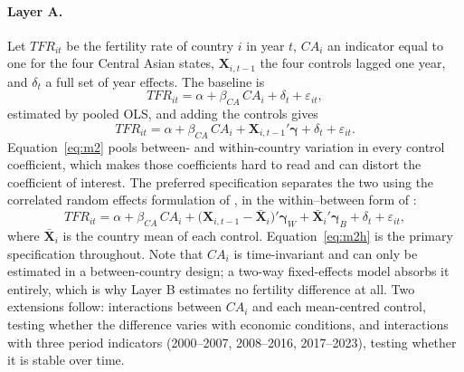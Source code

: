 \paragraph{Layer A.} Let $TFR_{it}$ be the fertility rate of country $i$ in year $t$, $CA_i$ an indicator equal to one for the four Central Asian states, $\mathbf{X}_{i,t-1}$ the four controls lagged one year, and $\delta_t$ a full set of year effects. The baseline is
\begin{equation}
TFR_{it} = \alpha + \beta_{CA}\, CA_i + \delta_t + \varepsilon_{it},
\label{eq:m1}
\end{equation}
estimated by pooled OLS, and adding the controls gives
\begin{equation}
TFR_{it} = \alpha + \beta_{CA}\, CA_i + \mathbf{X}_{i,t-1}'\boldsymbol{\gamma} + \delta_t + \varepsilon_{it}.
\label{eq:m2}
\end{equation}
Equation~\eqref{eq:m2} pools between- and within-country variation in every control coefficient, which makes those coefficients hard to read and can distort the coefficient of interest. The preferred specification separates the two using the correlated random effects formulation of \textcite{mundlak1978}, in the within--between form of \textcite{bell2015}:
\begin{equation}
TFR_{it} = \alpha + \beta_{CA}\, CA_i
+ \big(\mathbf{X}_{i,t-1}-\bar{\mathbf{X}}_i\big)'\boldsymbol{\gamma}_W
+ \bar{\mathbf{X}}_i'\boldsymbol{\gamma}_B
+ \delta_t + \varepsilon_{it},
\label{eq:m2h}
\end{equation}
where $\bar{\mathbf{X}}_i$ is the country mean of each control. Equation~\eqref{eq:m2h} is the primary specification throughout. Note that $CA_i$ is time-invariant and can only be estimated in a between-country design; a two-way fixed-effects model absorbs it entirely, which is why Layer B estimates no fertility difference at all. Two extensions follow: interactions between $CA_i$ and each mean-centred control, testing whether the difference varies with economic conditions, and interactions with three period indicators (2000--2007, 2008--2016, 2017--2023), testing whether it is stable over time.

